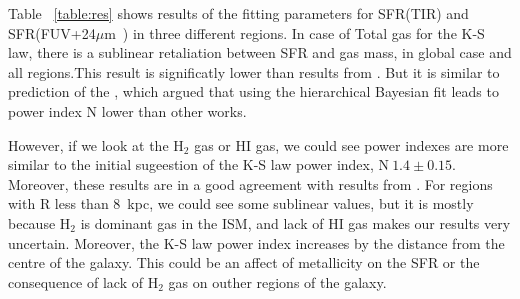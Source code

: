 \documentclass[useAMS,usenatbib]{mn2e}
\newcommand \kpc        {\,{\rm kpc}}
\newcommand \um    {$\mu$m\ }
\begin{document}

Table ~\ref{table:res} shows results of the fitting parameters for SFR(TIR) and SFR(FUV+24\um) in three different regions. In case of Total gas for the K-S law, there is a sublinear retaliation between SFR and gas mass, in global case and all regions.This result is significatly lower than results from \cite{Ford13}. But it is similar to prediction of the \cite{Shetty13}, which argued that using the hierarchical Bayesian fit leads to power index N lower than other works. 

However, if we look at the H$_{2}$ gas or HI gas, we could see power indexes are more similar to the initial sugeestion of the K-S law power index, N$ ~ 1.4\pm 0.15 $. Moreover, these results are in a good agreement with results from \cite{tabatabyi10}. For regions with R less than 8 \kpc, we could see some sublinear values, but it is mostly because H$_2$ is dominant gas in the ISM, and lack of HI gas makes our results very uncertain. Moreover, the K-S law power index increases by the distance from the centre of the galaxy. This could be an affect of metallicity on the SFR or the consequence of lack of H$_2$ gas on outher regions of the galaxy.  


\end{document}
